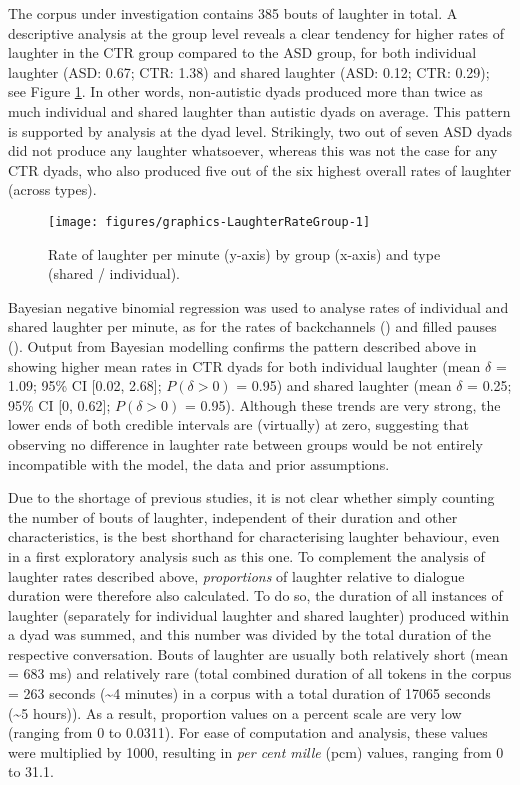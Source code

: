 The corpus under investigation contains 385 bouts of laughter in total. A descriptive analysis at the group level reveals a clear tendency for higher rates of laughter in the CTR group compared to the ASD group, for both individual laughter (ASD: 0.67; CTR: 1.38) and shared laughter (ASD: 0.12; CTR: 0.29); see Figure \ref{fig:LaughterRateGroup}. In other words, non-autistic dyads produced more than twice as much individual and shared laughter than autistic dyads on average. This pattern is supported by analysis at the dyad level. Strikingly, two out of seven ASD dyads did not produce any laughter whatsoever, whereas this was not the case for any CTR dyads, who also produced five out of the six highest overall rates of laughter (across types).



\begin{figure}

{\texttt{[image: figures/graphics-LaughterRateGroup-1]}
	
}

\caption{Rate of laughter per minute (y-axis) by group (x-axis) and type (shared / individual).}\label{fig:LaughterRateGroup}
\end{figure}

Bayesian negative binomial regression was used to analyse rates of individual and shared laughter per minute, as for the rates of backchannels () and filled pauses (). Output from Bayesian modelling confirms the pattern described above in showing higher mean rates in CTR dyads for both individual laughter (mean \(\delta\) = 1.09; 95\% CI {[}0.02, 2.68{]}; \(P(\delta > 0)\) = 0.95) and shared laughter (mean \(\delta\) = 0.25; 95\% CI {[}0, 0.62{]}; \(P(\delta > 0)\) = 0.95). Although these trends are very strong, the lower ends of both credible intervals are (virtually) at zero, suggesting that observing no difference in laughter rate between groups would be not entirely incompatible with the model, the data and prior assumptions.

Due to the shortage of previous studies, it is not clear whether simply counting the number of bouts of laughter, independent of their duration and other characteristics, is the best shorthand for characterising laughter behaviour, even in a first exploratory analysis such as this one. To complement the analysis of laughter rates described above, \emph{proportions} of laughter relative to dialogue duration were therefore also calculated. To do so, the duration of all instances of laughter (separately for individual laughter and shared laughter) produced within a dyad was summed, and this number was divided by the total duration of the respective conversation. Bouts of laughter are usually both relatively short (mean = 683 ms) and relatively rare (total combined duration of all tokens in the corpus = 263 seconds (\textasciitilde4 minutes) in a corpus with a total duration of 17065 seconds (\textasciitilde5 hours)). As a result, proportion values on a percent scale are very low (ranging from 0 to 0.0311). For ease of computation and analysis, these values were multiplied by 1000, resulting in \emph{per cent mille} (pcm) values, ranging from 0 to 31.1.

